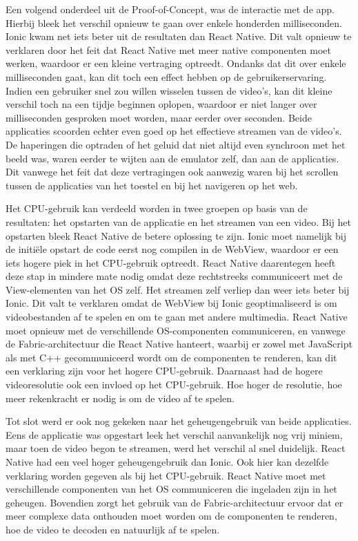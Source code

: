 Een volgend onderdeel uit de Proof-of-Concept, was de interactie met de app. Hierbij bleek het verschil opnieuw te gaan over enkele honderden milliseconden. Ionic kwam net iets beter uit de resultaten dan React Native. Dit valt opnieuw te verklaren door het feit dat React Native met meer native componenten moet werken, waardoor er een kleine vertraging optreedt. Ondanks dat dit over enkele milliseconden gaat, kan dit toch een effect hebben op de gebruikerservaring. Indien een gebruiker snel zou willen wisselen tussen de video's, kan dit kleine verschil toch na een tijdje beginnen oplopen, waardoor er niet langer over milliseconden gesproken moet worden, maar eerder over seconden. Beide applicaties scoorden echter even goed op het effectieve streamen van de video's. De haperingen die optraden of het geluid dat niet altijd even synchroon met het beeld was, waren eerder te wijten aan de emulator zelf, dan aan de applicaties. Dit vanwege het feit dat deze vertragingen ook aanwezig waren bij het scrollen tussen de applicaties van het toestel en bij het navigeren op het web.

Het CPU-gebruik kan verdeeld worden in twee groepen op basis van de resultaten: het opstarten van de applicatie en het streamen van een video. Bij het opstarten bleek React Native de betere oplossing te zijn. Ionic moet namelijk bij de initiële opstart de code eerst nog compilen in de WebView, waardoor er een iets hogere piek in het CPU-gebruik optreedt. React Native daarentegen heeft deze stap in mindere mate nodig omdat deze rechtstreeks communiceert met de View-elementen van het OS zelf. Het streamen zelf verliep dan weer iets beter bij Ionic. Dit valt te verklaren omdat de WebView bij Ionic geoptimaliseerd is om videobestanden af te spelen en om te gaan met andere multimedia. React Native moet opnieuw met de verschillende OS-componenten communiceren, en vanwege de Fabric-architectuur die React Native hanteert, waarbij er zowel met JavaScript als met C++ gecommuniceerd wordt om de componenten te renderen, kan dit een verklaring zijn voor het hogere CPU-gebruik. Daarnaast had de hogere videoresolutie ook een invloed op het CPU-gebruik. Hoe hoger de resolutie, hoe meer rekenkracht er nodig is om de video af te spelen.

Tot slot werd er ook nog gekeken naar het geheugengebruik van beide applicaties. Eens de applicatie was opgestart leek het verschil aanvankelijk nog vrij miniem, maar toen de video begon te streamen, werd het verschil al snel duidelijk. React Native had een veel hoger geheugengebruik dan Ionic. Ook hier kan dezelfde verklaring worden gegeven als bij het CPU-gebruik. React Native moet met verschillende componenten van het OS communiceren die ingeladen zijn in het geheugen. Bovendien zorgt het gebruik van de Fabric-architectuur ervoor dat er meer complexe data onthouden moet worden om de componenten te renderen, hoe de video te decoden en natuurlijk af te spelen.

